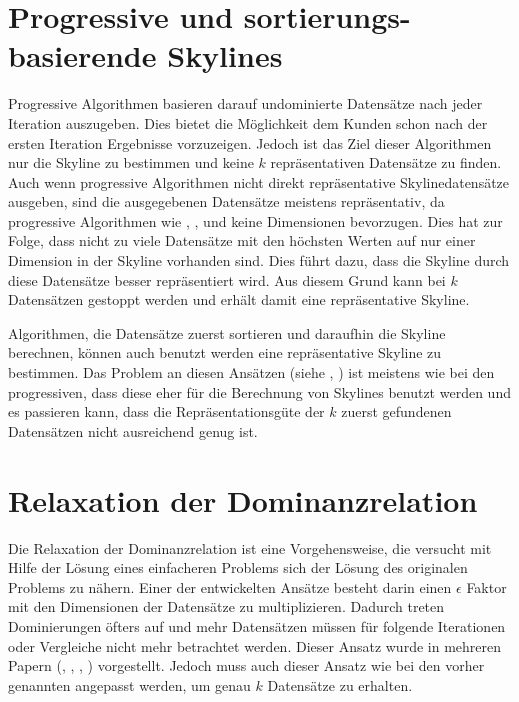 \section{Progressive und sortierungs-basierende Skylines}
\label{ch:Forschungsstand:sec:progSortSky}
Progressive Algorithmen basieren darauf undominierte Datensätze nach jeder Iteration auszugeben. Dies bietet die Möglichkeit dem Kunden schon nach der ersten Iteration Ergebnisse vorzuzeigen. Jedoch ist das Ziel dieser Algorithmen nur die Skyline zu bestimmen und keine $k$ repräsentativen Datensätze zu finden.
Auch wenn progressive Algorithmen nicht direkt repräsentative Skylinedatensätze ausgeben, sind die ausgegebenen Datensätze meistens repräsentativ, da progressive Algorithmen wie \cite{Tan:2001:EPS:645927.672217}, \cite{papadias2005progressive}, \cite{Kossmann:2002:SSS:1287369.1287394} und \cite{Papadias:2003:OPA:872757.872814} keine Dimensionen bevorzugen. Dies hat zur Folge, dass nicht zu viele Datensätze mit den höchsten Werten auf nur einer Dimension in der Skyline vorhanden sind. Dies führt dazu, dass die Skyline durch diese Datensätze besser repräsentiert wird. Aus diesem Grund kann bei $k$ Datensätzen gestoppt werden und erhält damit eine repräsentative Skyline.

Algorithmen, die Datensätze zuerst sortieren und daraufhin die Skyline berechnen, können auch benutzt werden eine repräsentative Skyline zu bestimmen. Das Problem an diesen Ansätzen (siehe \cite{1260846}, \cite{lee2010z}) ist meistens wie bei den progressiven, dass diese eher für die Berechnung von Skylines benutzt werden und es passieren kann, dass die Repräsentationsgüte der $k$ zuerst gefundenen Datensätzen nicht ausreichend genug ist.
\section{Relaxation der Dominanzrelation}
\label{ch:Forschungsstand:sec:relaxDomRel}
Die Relaxation der Dominanzrelation ist eine Vorgehensweise, die versucht mit Hilfe der Lösung eines einfacheren Problems sich der Lösung des originalen Problems zu nähern. 
Einer der entwickelten Ansätze besteht darin einen $\epsilon$ Faktor mit den Dimensionen der Datensätze zu multiplizieren. Dadurch treten Dominierungen öfters auf und mehr Datensätzen müssen für folgende Iterationen oder Vergleiche nicht mehr betrachtet werden. Dieser Ansatz wurde in mehreren Papern (\cite{Koltun05approximatelydominating}, \cite{Su:2007:AMA:1418332.1418454}, \cite{Vassilvitskii:2005:ECS:1132633.1132648}, \cite{Xia:2008:SFD:1546682.1547149}) vorgestellt. Jedoch muss auch dieser Ansatz wie bei den vorher genannten angepasst werden, um genau $k$ Datensätze zu erhalten.

